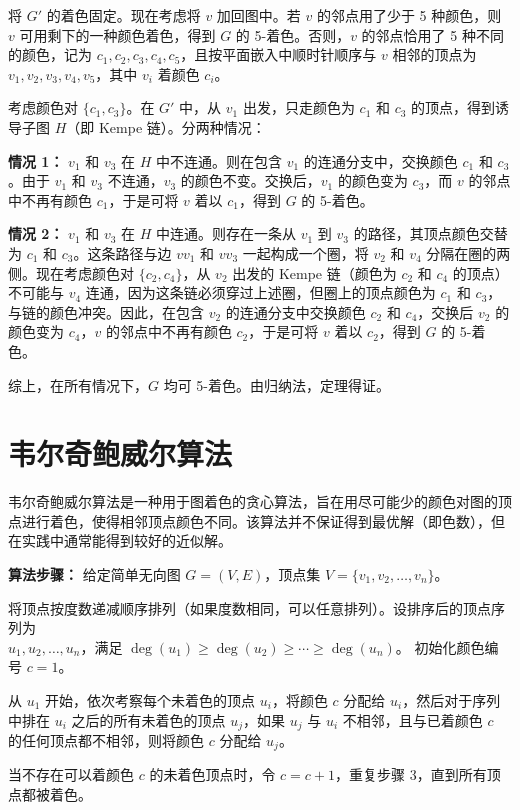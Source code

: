     将 $G'$ 的着色固定。现在考虑将 $v$ 加回图中。若 $v$ 的邻点用了少于 5 种颜色，则 $v$ 可用剩下的一种颜色着色，得到 $G$ 的 5-着色。否则，$v$ 的邻点恰用了 5 种不同的颜色，记为 $c_1, c_2, c_3, c_4, c_5$，且按平面嵌入中顺时针顺序与 $v$ 相邻的顶点为 $v_1, v_2, v_3, v_4, v_5$，其中 $v_i$ 着颜色 $c_i$。

    考虑颜色对 $\{c_1, c_3\}$。在 $G'$ 中，从 $v_1$ 出发，只走颜色为 $c_1$ 和 $c_3$ 的顶点，得到诱导子图 $H$（即 Kempe 链）。分两种情况：

    \textbf{情况 1：} $v_1$ 和 $v_3$ 在 $H$ 中不连通。则在包含 $v_1$ 的连通分支中，交换颜色 $c_1$ 和 $c_3$。由于 $v_1$ 和 $v_3$ 不连通，$v_3$ 的颜色不变。交换后，$v_1$ 的颜色变为 $c_3$，而 $v$ 的邻点中不再有颜色 $c_1$，于是可将 $v$ 着以 $c_1$，得到 $G$ 的 5-着色。

    \textbf{情况 2：} $v_1$ 和 $v_3$ 在 $H$ 中连通。则存在一条从 $v_1$ 到 $v_3$ 的路径，其顶点颜色交替为 $c_1$ 和 $c_3$。这条路径与边 $v v_1$ 和 $v v_3$ 一起构成一个圈，将 $v_2$ 和 $v_4$ 分隔在圈的两侧。现在考虑颜色对 $\{c_2, c_4\}$，从 $v_2$ 出发的 Kempe 链（颜色为 $c_2$ 和 $c_4$ 的顶点）不可能与 $v_4$ 连通，因为这条链必须穿过上述圈，但圈上的顶点颜色为 $c_1$ 和 $c_3$，与链的颜色冲突。因此，在包含 $v_2$ 的连通分支中交换颜色 $c_2$ 和 $c_4$，交换后 $v_2$ 的颜色变为 $c_4$，$v$ 的邻点中不再有颜色 $c_2$，于是可将 $v$ 着以 $c_2$，得到 $G$ 的 5-着色。

    综上，在所有情况下，$G$ 均可 5-着色。由归纳法，定理得证。
\section{韦尔奇鲍威尔算法}
    韦尔奇鲍威尔算法是一种用于图着色的贪心算法，旨在用尽可能少的颜色对图的顶点进行着色，使得相邻顶点颜色不同。该算法并不保证得到最优解（即色数），但在实践中通常能得到较好的近似解。

    \textbf{算法步骤：}
    给定简单无向图 $G=(V,E)$，顶点集 $V=\{v_1,v_2,\ldots,v_n\}$。
    
         将顶点按度数递减顺序排列（如果度数相同，可以任意排列）。设排序后的顶点序列为\\$u_1,u_2,\ldots,u_n$，满足 $\deg(u_1) \ge \deg(u_2) \ge \cdots \ge \deg(u_n)$。
         初始化颜色编号 $c=1$。

         从 $u_1$ 开始，依次考察每个未着色的顶点 $u_i$，将颜色 $c$ 分配给 $u_i$，然后对于序列中排在 $u_i$ 之后的所有未着色的顶点 $u_j$，如果 $u_j$ 与 $u_i$ 不相邻，且与已着颜色 $c$ 的任何顶点都不相邻，则将颜色 $c$ 分配给 $u_j$。

         当不存在可以着颜色 $c$ 的未着色顶点时，令 $c=c+1$，重复步骤 3，直到所有顶点都被着色。
    
